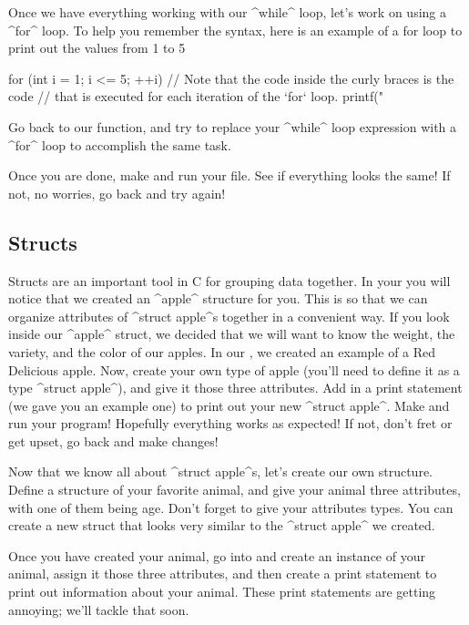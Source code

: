\documentclass{tufte-handout}
\begin{document}
Once we have everything working with our ^while^ loop, let's work on
using a ^for^ loop.  To help you remember the syntax, here is an example of a for loop to print out the values from 1 to 5

\begin{Code}
    for (int i = 1; i <= 5; ++i) {
        // Note that the code inside the curly braces is the code
        // that is executed for each iteration of the `for` loop.
        printf("%
    }
\end{Code}

Go back to our  function, and try to replace
your ^while^ loop expression with a ^for^ loop to accomplish the same task.

Once you are done, make and run your file.  See if everything looks the same!  If not, no worries, go back and try again!


\subsection{Structs}


Structs are an important tool in C for grouping data together.  In your
 you will notice that we created an ^apple^ structure
for you.  This is so that we can
organize attributes of ^struct apple^s together in a convenient way.  If
you look inside our ^apple^ struct, we decided that we will want to know
the weight, the variety, and the color of our apples.  In our
, we created an example of a Red Delicious apple.
Now, create your own type of apple (you'll need to define it as a type
^struct apple^), and give it those three attributes.  Add in a print
statement (we gave you an example one) to print out your new ^struct
apple^.  Make and run your  program!  Hopefully everything
works as expected!  If not, don't fret or get upset, go back and make
changes!

Now that we know all about ^struct apple^s, let's create our own
structure. Define a structure of your favorite animal, and give your
animal three attributes, with one of them being age. Don't forget to
give your attributes types. You can create a new struct that looks very
similar to the ^struct apple^ we created.

Once you have created your animal, go into  and
create an instance of your animal, assign it those three attributes, and
then create a print statement to print out information about your
animal.  These print statements are getting annoying; we'll tackle that
soon.
\end{document}
